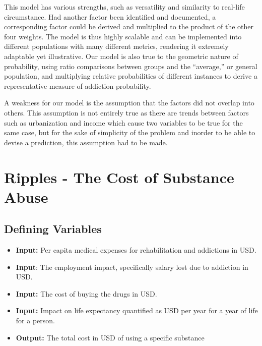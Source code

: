 \documentclass[12pt]{article}
\begin{document}
This model has various strengths, such as versatility and similarity to real-life circumstance. Had another factor been identified and documented, a corresponding factor could be derived and multiplied to the product of the other four weights. The model is thus highly scalable and can be implemented into different populations with many different metrics, rendering it extremely adaptable yet illustrative. Our model is also true to the geometric nature of probability, using ratio comparisons between groups and the “average,” or general population, and multiplying relative probabilities of different instances to derive a representative measure of addiction probability.

A weakness for our model is the assumption that the factors did not overlap into others. This assumption is not entirely true as there are trends between factors such as urbanization and income which cause two variables to be true for the same case, but for the sake of simplicity of the problem and inorder to be able to devise a prediction, this assumption had to be made. 


\section{Ripples - The Cost of Substance Abuse}

\subsection{Defining Variables}
\begin{itemize}
    \item \textbf{Input:} Per capita medical expenses for rehabilitation and addictions in USD. 
    \item \textbf{Input}: The employment impact, specifically salary lost due to addiction in USD. 
    \item \textbf{Input:} The cost of buying the drugs in USD.
    \item \textbf{Input:} Impact on life expectancy quantified as USD per year for a year of life for a person. 
    \item \textbf{Output:} The total cost in USD of using a specific substance
\end{itemize}
\end{document}
